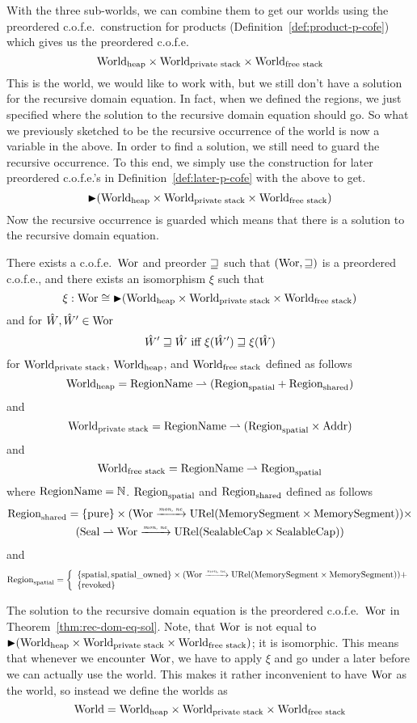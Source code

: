 \begin{jversion}
With the three sub-worlds, we can combine them to get our worlds using the preordered c.o.f.e.\ construction for products (Definition~\ref{def:product-p-cofe}) which gives us the preordered c.o.f.e.
\[
  \mathrm{World}_\mathrm{heap} \times \mathrm{World}_\text{private stack} \times \mathrm{World}_\text{free stack}
\]
This is the world, we would like to work with, but we still don't have a solution for the recursive domain equation.
In fact, when we defined the regions, we just specified where the solution to the recursive domain equation should go.
So what we previously sketched to be the recursive occurrence of the world is now a variable in the above.
In order to find a solution, we still need to guard the recursive occurrence.
To this end, we simply use the construction for later preordered c.o.f.e.'s in Definition~\ref{def:later-p-cofe} with the above to get.
\[
  \mathop{\blacktriangleright} (\mathrm{World}_\mathrm{heap} \times \mathrm{World}_\text{private stack} \times \mathrm{World}_\text{free stack})
\]
Now the recursive occurrence is guarded which means that there is a solution to the recursive domain equation.

\begin{theorem}
  \label{thm:rec-dom-eq-sol}
  There exists a c.o.f.e.\ $\mathrm{Wor}$ and preorder $\sqsupseteq$ such that $(\mathrm{Wor},\sqsupseteq)$ is a preordered c.o.f.e., and there exists an isomorphism $\xi$ such that
  \[
    \xi : \mathrm{Wor} \cong \mathop{\blacktriangleright} (\mathrm{World}_\mathrm{heap} \times \mathrm{World}_\text{private stack} \times \mathrm{World}_\text{free stack})
  \]
  and for $\hat{W},\hat{W}' \in \mathrm{Wor}$
  \[
    \hat{W}' \sqsupseteq \hat{W} \text{ iff } \xi(\hat{W}') \sqsupseteq \xi(\hat{W})
  \]
  for $\mathrm{World}_\text{private stack}$, $\mathrm{World}_\mathrm{heap}$, and $\mathrm{World}_\text{free stack}$ defined as follows
\[
  \mathrm{World}_\mathrm{heap} = \mathrm{RegionName} \rightharpoonup (\mathrm{Region}_\mathrm{spatial} + \mathrm{Region}_\mathrm{shared})
\]
and
\[
  \mathrm{World}_\text{private stack} = \mathrm{RegionName} \rightharpoonup (\mathrm{Region}_\mathrm{spatial} \times \mathrm{Addr})
\]
and
\[
  \mathrm{World}_\text{free stack} = \mathrm{RegionName} \rightharpoonup \mathrm{Region}_\mathrm{spatial}
\]
where $\mathrm{RegionName} = \mathbb{N}$. $\mathrm{Region}_\mathrm{spatial}$ and $\mathrm{Region}_\mathrm{shared}$ defined as follows
\begin{multline*}
  \mathrm{Region}_\mathrm{shared} = 
  \{\mathrm{pure} \} \times (\mathrm{Wor} \xrightarrow{\textit{\tiny{mon, ne}}} \mathrm{URel}(\mathrm{MemorySegment}\times\mathrm{MemorySegment})) \times \\
  (\mathrm{Seal} \rightharpoonup \mathrm{Wor} \xrightarrow{\textit{\tiny{mon, ne}}} \mathrm{URel}(\mathrm{SealableCap}\times\mathrm{SealableCap}))
\end{multline*}
and
\[
  \mathrm{Region}_\mathrm{spatial} = \left\{
  \begin{array}{l}
    \{\mathrm{spatial}, \mathrm{spatial\_owned}\} \times (\mathrm{Wor} \xrightarrow{\textit{\tiny{mon, ne}}} \mathrm{URel}(\mathrm{MemorySegment}\times\mathrm{MemorySegment})) +\\
    \{\mathrm{revoked}\}
  \end{array} \right.
\]
\end{theorem}
The solution to the recursive domain equation is the preordered c.o.f.e.\ $\mathrm{Wor}$ in Theorem~\ref{thm:rec-dom-eq-sol}.
Note, that $\mathrm{Wor}$ is not equal to $\mathop{\blacktriangleright} (\mathrm{World}_\mathrm{heap} \times \mathrm{World}_\text{private stack} \times \mathrm{World}_\text{free stack})$; it is isomorphic.
This means that whenever we encounter $\mathrm{Wor}$, we have to apply $\xi$ and go under a later before we can actually use the world.
This makes it rather inconvenient to have $\mathrm{Wor}$ as the world, so instead we define the worlds as 
\[
  \mathrm{World} = \mathrm{World}_\mathrm{heap} \times \mathrm{World}_\text{private stack} \times \mathrm{World}_\text{free stack}
\]


\end{jversion}
